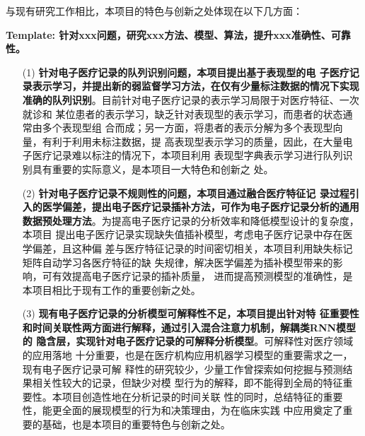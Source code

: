 与现有研究工作相比，本项目的特色与创新之处体现在以下几方面：

\textbf{Template: 针对xxx问题，研究xxx方法、模型、算法，提升xxx准确性、可靠性。}

\begin{itemize}
    \item[(1)] \textbf{针对电子医疗记录的队列识别问题，本项目提出基于表现型的电
    子医疗记录表示学习，并提出新的弱监督学习方法，在仅有少量标注数据的情况下实现
    准确的队列识别}。目前针对电子医疗记录的表示学习局限于对医疗特征、一次就诊和
    某位患者的表示学习，缺乏针对表现型的表示学习，而患者的状态通常由多个表现型组
    合而成；另一方面，将患者的表示分解为多个表现型向量，有利于利用未标注数据，提
    高表现型表示学习的质量，因此，在大量电子医疗记录难以标注的情况下，本项目利用
    表现型字典表示学习进行队列识别具有重要的实际意义，是本项目一大特色和创新之
    处。
    \item[(2)] \textbf{针对电子医疗记录不规则性的问题，本项目通过融合医疗特征记
    录过程引入的医学偏差，提出电子医疗记录插补方法，可作为电子医疗记录分析的通用
    数据预处理方法}。为提高电子医疗记录的分析效率和降低模型设计的复杂度，本项目
    提出电子医疗记录实现缺失值插补模型，考虑电子医疗记录中存在医学偏差，且这种偏
    差与医疗特征记录的时间密切相关，本项目利用缺失标记矩阵自动学习各医疗特征的缺
    失规律，解决医学偏差为插补模型带来的影响，可有效提高电子医疗记录的插补质量，
    进而提高预测模型的准确性，是本项目相比于现有工作的重要创新之处。
    \item[(3)] \textbf{现有电子医疗记录的分析模型可解释性不足，本项目提出针对特
    征重要性和时间关联性两方面进行解释，通过引入混合注意力机制，解耦类RNN模型的
    隐含层，实现针对电子医疗记录的可解释分析模型}。可解释性对医疗领域的应用落地
    十分重要，也是在医疗机构应用机器学习模型的重要需求之一，现有电子医疗记录可解
    释性的研究较少，少量工作曾探索如何挖掘与预测结果相关性较大的记录，但缺少对模
    型行为的解释，即不能得到全局的特征重要性。本项目创造性地在分析记录的时间关联
    性的同时，总结特征的重要性，能更全面的展现模型的行为和决策理由，为在临床实践
    中应用奠定了重要的基础，也是本项目的重要特色与创新之处。
\end{itemize}